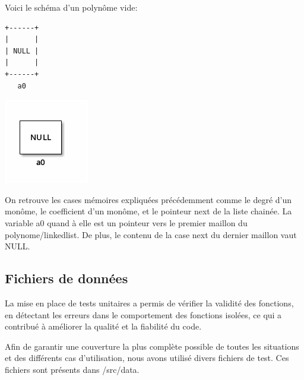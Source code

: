 \documentclass[11pt]{article}
\begin{document}
Voici le schéma d'un polynôme vide:
\begin{verbatim}
+------+
|      |
| NULL |
|      |
+------+
   a0	  
\end{verbatim}
\begin{center}
\includegraphics[width=.9\linewidth]{img/structure_cell_empty.png}
\end{center}

On retrouve les cases mémoires expliquées précédemment comme le degré d'un monôme, le
coefficient d'un monôme, et le pointeur next de la liste chainée.
La variable a0 quand à elle est un pointeur vers le premier maillon du
polynome/linkedlist. De plus, le contenu de la case next du dernier maillon vaut NULL.

\subsection{Fichiers de données}
\label{sec:orgf318a46}

La mise en place de tests unitaires a permis de vérifier la validité des
fonctions, en détectant les erreurs dans le comportement des fonctions isolées,
ce qui a contribué à améliorer la qualité et la fiabilité du code.

Afin de garantir une couverture la plus complète possible de toutes les
situations et des différents cas d'utilisation, nous avons utilisé divers
fichiers de test. Ces fichiers sont présents dans /src/data.
\end{document}
